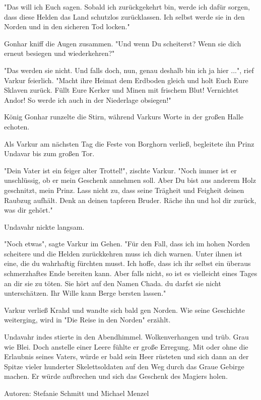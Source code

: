 \documentclass[10pt, a4paper, oneside]{book}
\begin{document}
\begin{multicols}{2}
"Das will ich Euch sagen. Sobald ich zurückgekehrt bin, werde ich dafür sorgen, dass diese Helden das Land schutzlos zurücklassen. Ich selbst werde sie in den Norden und in den sicheren Tod locken."

Gonhar kniff die Augen zusammen. "Und wenn Du scheiterst? Wenn sie dich erneut besiegen und wiederkehren?"

"Das werden sie nicht. Und falls doch, nun, genau deshalb bin ich ja hier ...", rief Varkur feierlich. "Macht ihre Heimat dem Erdboden gleich und holt Euch Eure Sklaven zurück. Füllt Eure Kerker und Minen mit frischem Blut! Vernichtet Andor! So werde ich auch in der Niederlage obsiegen!"

König Gonhar runzelte die Stirn, während Varkurs Worte in der großen Halle echoten.\bigskip

Als Varkur am nächsten Tag die Feste von Borghorn verließ, begleitete ihn Prinz Undavar bis zum großen Tor.

"Dein Vater ist ein feiger alter Trottel!", zischte Varkur. "Noch immer ist er unschlüssig, ob er mein Geschenk annehmen soll. Aber Du bist aus anderem Holz geschnitzt, mein Prinz. Lass nicht zu, dass seine Trägheit und Feigheit deinen Raubzug aufhält. Denk  an deinen tapferen Bruder. Räche ihn und hol dir zurück, was dir gehört."

Undavahr nickte langsam.

"Noch etwas", sagte Varkur im Gehen. "Für den Fall, dass ich im hohen Norden scheitere und die Helden zurückkehren muss ich dich warnen. Unter ihnen ist eine, die du wahrhaftig fürchten musst. Ich hoffe, dass ich ihr selbst ein überaus schmerzhaftes Ende bereiten kann. Aber falls nicht, so ist es vielleicht eines Tages an dir sie zu töten. Sie hört auf den Namen Chada. du darfst sie nicht unterschätzen. Ihr Wille kann Berge bersten lassen."\bigskip

Varkur verließ Krahd und wandte sich bald gen Norden. Wie seine Geschichte weiterging, wird in "Die Reise in den Norden" erzählt.\bigskip

Undavahr indes stierte in den Abendhimmel. Wolkenverhangen und trüb. Grau wie Blei. Doch anstelle einer Leere fühlte er große Erregung. Mit oder ohne die Erlaubnis seines Vaters, würde er bald sein Heer rüsteten und sich dann an der Spitze vieler hunderter Skelettsoldaten auf den Weg durch das Graue Gebirge machen. Er würde aufbrechen und sich das Geschenk des Magiers holen.\bigskip

Autoren: Stefanie Schmitt und Michael Menzel







\end{multicols}
\end{document}
